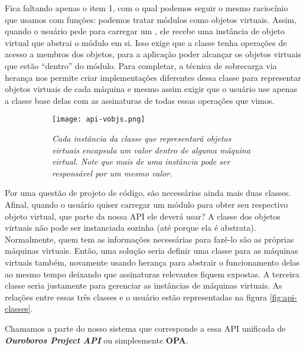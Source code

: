     Fica faltando apenas o item 1, com o qual podemos seguir o mesmo raciocínio
    que usamos com funções: podemos tratar módulos como objetos virtuais. Assim,
    quando o usuário pede para carregar um \script{}, ele recebe uma instância
    de objeto virtual que abstrai o módulo em si. Isso exige que a classe
    tenha operações de acesso a membros dos objetos, para a aplicação poder
    alcançar os objetos virtuais que estão ``dentro'' do módulo. Para completar,
    a técnica de sobrecarga via herança nos permite criar implementações diferentes
    dessa classe para representar objetos virtuais de cada máquina e mesmo
    assim exigir que o usuário use apenas a classe base delas com as assinaturas de
    todas essas operações que vimos. 

    \begin{figure}[ht]
      \centering
      \caption{}
      \begin{subfigure}{.8\textwidth}
        \begin{center}
          \texttt{[image: api-vobjs.png]}
          \vspace{1em}

          \textit{
            Cada instância da classe que representará objetos virtuais encapsula
            um valor dentro de alguma máquina virtual. Note que mais de uma
            instância pode ser responsável por um mesmo valor.
          }
        \end{center}
      \end{subfigure}
      \label{fig:api-vobjs}
    \end{figure}

    Por uma questão de projeto de código, são necessárias ainda mais duas
    classes. Afinal, quando o usuário quiser carregar um módulo para obter seu
    respectivo objeto virtual, que parte da nossa API ele deverá usar? A classe
    dos objetos virtuais não pode ser instanciada sozinha (até porque ela é
    abstrata). Normalmente, quem tem as informações necessárias para fazê-lo são
    as próprias máquinas virtuais. Então, uma solução seria definir uma classe
    para as máquinas virtuais também, novamente usando herança para abstrair o
    funcionamento delas ao mesmo tempo deixando que assinaturas relevantes fiquem
    expostas. A terceira classe seria justamente para gerenciar as instâncias de
    máquinas virtuais. As relações entre essas três classes e o usuário estão
    representadas na figura \ref{fig:api-classes}.

    Chamamos a parte do nosso sistema que corresponde a essa API unificada de
    \emph{\textbf{Ouroboros Project API}} ou simplesmente \textbf{OPA}.

